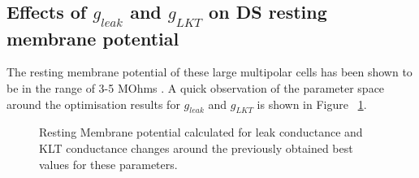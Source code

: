 

\subsection{Effects of $g_{leak}$ and $g_{LKT}$ on DS resting membrane potential}

The resting membrane potential of these large multipolar cells has been shown to be in the range of 3-5 MOhms . A quick observation of the parameter space around the optimisation results for $g_{leak}$ and $g_{LKT}$ is shown in Figure ~\ref{fig:leakVltk}.  
 \begin{figure}[h!]
   \centering
   \caption{Resting Membrane potential calculated for leak conductance and KLT conductance changes around the previously obtained best values for these parameters.}\label{fig:leakVltk}
 \end{figure}


